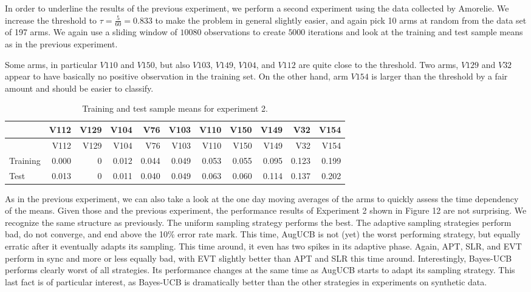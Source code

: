 \documentclass[11pt,]{article}
\begin{document}
In order to underline the results of the previous experiment, we perform
a second experiment using the data collected by Amorelie. We increase
the threshold to \(\tau = \frac{5}{60} = 0.833\) to make the problem in
general slightly easier, and again pick 10 arms at random from the data
set of 197 arms. We again use a sliding window of \(10080\) observations
to create \(5000\) iterations and look at the training and test sample
means as in the previous experiment.

Some arms, in particular \(V110\) and \(V150\), but also \(V103\),
\(V149\), \(V104\), and \(V112\) are quite close to the threshold. Two
arms, \(V129\) and \(V32\) appear to have basically no positive
observation in the training set. On the other hand, arm \(V154\) is
larger than the threshold by a fair amount and should be easier to
classify.

\begin{longtable}[]{@{}lrrrrrrrrrr@{}}
\caption{Training and test sample means for experiment
2.}\tabularnewline
\toprule
& V112 & V129 & V104 & V76 & V103 & V110 & V150 & V149 & V32 &
V154\tabularnewline
\midrule
\endfirsthead
\toprule
& V112 & V129 & V104 & V76 & V103 & V110 & V150 & V149 & V32 &
V154\tabularnewline
\midrule
\endhead
Training & 0.000 & 0 & 0.012 & 0.044 & 0.049 & 0.053 & 0.055 & 0.095 &
0.123 & 0.199\tabularnewline
Test & 0.013 & 0 & 0.011 & 0.040 & 0.049 & 0.063 & 0.060 & 0.114 & 0.137
& 0.202\tabularnewline
\bottomrule
\end{longtable}

As in the previous experiment, we can also take a look at the one day
moving averages of the arms to quickly assess the time dependency of the
means. Given those and the previous experiment, the performance results
of Experiment 2 shown in Figure 12 are not surprising. We recognize the
same structure as previously. The uniform sampling strategy performs the
best. The adaptive sampling strategies perform bad, do not converge, and
end above the 10\% error rate mark. This time, AugUCB is not (yet) the
worst performing strategy, but equally erratic after it eventually
adapts its sampling. This time around, it even has two spikes in its
adaptive phase. Again, APT, SLR, and EVT perform in sync and more or
less equally bad, with EVT slightly better than APT and SLR this time
around. Interestingly, Bayes-UCB performs clearly worst of all
strategies. Its performance changes at the same time as AugUCB starts to
adapt its sampling strategy. This last fact is of particular interest,
as Bayes-UCB is dramatically better than the other strategies in
experiments on synthetic data.
\end{document}
